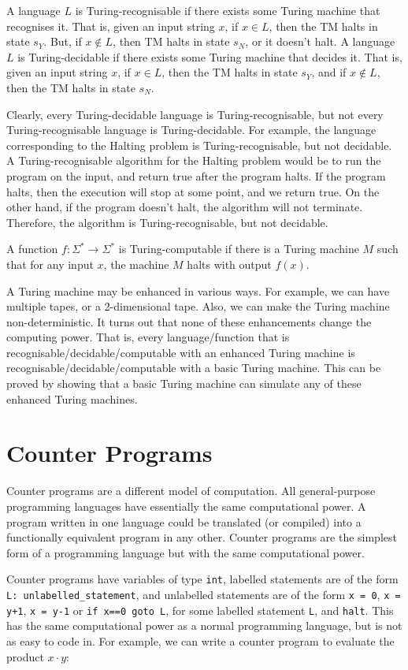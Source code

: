 \documentclass[a4paper, openany]{memoir}
\begin{document}
A language $L$ is Turing-recognisable if there exists some Turing machine that recognises it. That is, given an input string $x$, if $x \in L$, then the TM halts in state $s_Y$. But, if $x \not\in L$, then TM halts in state $s_N$, or it doesn't halt. A language $L$ is Turing-decidable if there exists some Turing machine that decides it. That is, given an input string $x$, if $x \in L$, then the TM halts in state $s_Y$, and if $x \not\in L$, then the TM halts in state $s_N$. 

Clearly, every Turing-decidable language is Turing-recognisable, but not every Turing-recognisable language is Turing-decidable. For example, the language corresponding to the Halting problem is Turing-recognisable, but not decidable. A Turing-recognisable algorithm for the Halting problem would be to run the program on the input, and return true after the program halts. If the program halts, then the execution will stop at some point, and we return true. On the other hand, if the program doesn't halt, the algorithm will not terminate. Therefore, the algorithm is Turing-recognisable, but not decidable.

A function $f: \Sigma^* \to \Sigma^*$ is Turing-computable if there is a Turing machine $M$ such that for any input $x$, the machine $M$ halts with output $f(x)$.

A Turing machine may be enhanced in various ways. For example, we can have multiple tapes, or a 2-dimensional tape. Also, we can make the Turing machine non-deterministic. It turns out that none of these enhancements change the computing power. That is, every language/function that is recognisable/decidable/computable with an enhanced Turing machine is recognisable/decidable/computable with a basic Turing machine. This can be proved by showing that a basic Turing machine can simulate any of these enhanced Turing machines.
\newpage

\section{Counter Programs}
Counter programs are a different model of computation. All general-purpose programming languages have essentially the same computational power. A program written in one language could be translated (or compiled) into a functionally equivalent program in any other. Counter programs are the simplest form of a programming language but with the same computational power.

Counter programs have variables of type \texttt{int}, labelled statements are of the form \texttt{L: unlabelled\_statement}, and unlabelled statements are of the form \texttt{x = 0}, \texttt{x = y+1}, \texttt{x = y-1} or \texttt{if x==0 goto L}, for some labelled statement \texttt{L}, and \texttt{halt}. This has the same computational power as a normal programming language, but is not as easy to code in. For example, we can write a counter program to evaluate the product $x \cdot y$:

\end{document}
